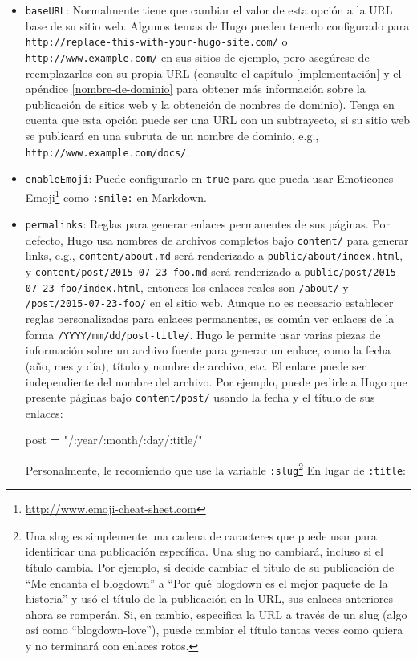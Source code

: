 \documentclass[12pt,]{krantz}
\makeatletter
\newenvironment{Shaded}{\begin{snugshade}}{\end{snugshade}}
\newcommand{\NormalTok}[1]{#1}
\newcommand{\OperatorTok}[1]{\textcolor[rgb]{0.81,0.36,0.00}{\textbf{#1}}}
\newcommand{\StringTok}[1]{\textcolor[rgb]{0.31,0.60,0.02}{#1}}
\renewcommand{\href}[2]{#2\footnote{\url{#1}}}
\newenvironment{kframe}{%
\medskip{}
\setlength{\fboxsep}{.8em}
 \def\at@end@of@kframe{}%
 \ifinner\ifhmode%
  \def\at@end@of@kframe{\end{minipage}}%
  \begin{minipage}{\columnwidth}%
 \fi\fi%
 \def\FrameCommand##1{\hskip\@totalleftmargin \hskip-\fboxsep
 \colorbox{shadecolor}{##1}\hskip-\fboxsep
     \hskip-\linewidth \hskip-\@totalleftmargin \hskip\columnwidth}%
 \MakeFramed {\advance\hsize-\width
   \@totalleftmargin\z@ \linewidth\hsize
   \@setminipage}}%
 {\par\unskip\endMakeFramed%
 \at@end@of@kframe}
\renewenvironment{Shaded}{\begin{kframe}}{\end{kframe}}
\theoremstyle{definition}
\theoremstyle{definition}
\theoremstyle{definition}
\theoremstyle{remark}
\makeatother
\begin{document}
\begin{itemize}
\item
  \texttt{baseURL}: Normalmente tiene que cambiar el valor de esta
  opción a la URL base de su sitio web. Algunos temas de
  Hugo pueden tenerlo configurado para
  \texttt{http://replace-this-with-your-hugo-site.com/} o
  \texttt{http://www.example.com/} en sus sitios de ejemplo, pero
  asegúrese de reemplazarlos con su propia URL (consulte el capítulo
  \ref{implementación} y el apéndice \ref{nombre-de-dominio} para
  obtener más información sobre la publicación de sitios web y la
  obtención de nombres de dominio). Tenga en cuenta que esta opción
  puede ser una URL con un subtrayecto, si su sitio web se publicará en
  una subruta de un nombre de dominio, e.g.,
  \texttt{http://www.example.com/docs/}.
\item
  \texttt{enableEmoji}: Puede configurarlo en \texttt{true}
  para que pueda usar \href{http://www.emoji-cheat-sheet.com}{Emoticones
  Emoji} como \texttt{:smile:} en Markdown.
\item
  \texttt{permalinks}: Reglas para generar enlaces
  permanentes de sus páginas. Por defecto, Hugo usa
  nombres de archivos completos bajo \texttt{content/} para generar
  links, e.g., \texttt{content/about.md} será renderizado a
  \texttt{public/about/index.html}, y
  \texttt{content/post/2015-07-23-foo.md} será renderizado a
  \texttt{public/post/2015-07-23-foo/index.html}, entonces los enlaces
  reales son \texttt{/about/} y \texttt{/post/2015-07-23-foo/} en el
  sitio web. Aunque no es necesario establecer reglas personalizadas
  para enlaces permanentes, es común ver enlaces de la forma
  \texttt{/YYYY/mm/dd/post-title/}. Hugo le permite usar varias piezas
  de información sobre un archivo fuente para generar un enlace, como la
  fecha (año, mes y día), título y nombre de archivo, etc. El enlace
  puede ser independiente del nombre del archivo. Por ejemplo, puede
  pedirle a Hugo que presente páginas bajo \texttt{content/post/} usando
  la fecha y el título de sus enlaces:

\begin{Shaded}
\begin{Highlighting}[]
\NormalTok{[permalinks]}
\NormalTok{    post }\OperatorTok{=} \StringTok{"/:year/:month/:day/:title/"}
\end{Highlighting}
\end{Shaded}

  Personalmente, le recomiendo que use la variable 
  \texttt{:slug}\footnote{Una slug es simplemente una cadena de
    caracteres que puede usar para identificar una publicación
    específica. Una slug no cambiará, incluso si el título cambia. Por
    ejemplo, si decide cambiar el título de su publicación de ``Me
    encanta el blogdown'' a ``Por qué blogdown es el mejor paquete de la
    historia'' y usó el título de la publicación en la URL, sus enlaces
    anteriores ahora se romperán. Si, en cambio, especifica la URL a
    través de un slug (algo así como ``blogdown-love''), puede cambiar
    el título tantas veces como quiera y no terminará con enlaces rotos.}
  En lugar de \texttt{:títle}:


\end{itemize}
\end{document}
